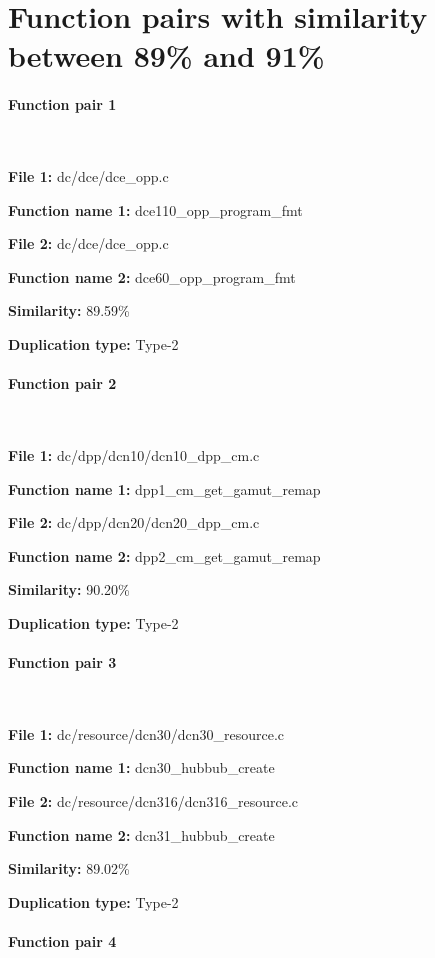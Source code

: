 \section{Function pairs with similarity between 89\% and 91\%}

\paragraph{Function pair 1 }  

\

\textbf{File 1:} dc/dce/dce\_opp.c

\textbf{Function name 1:} dce110\_opp\_program\_fmt

\textbf{File 2:} dc/dce/dce\_opp.c

\textbf{Function name 2:} dce60\_opp\_program\_fmt

\textbf{Similarity:} 89.59\%

\textbf{Duplication type:} Type-2


\paragraph{Function pair 2 }  

\

\textbf{File 1:} dc/dpp/dcn10/dcn10\_dpp\_cm.c

\textbf{Function name 1:} dpp1\_cm\_get\_gamut\_remap

\textbf{File 2:} dc/dpp/dcn20/dcn20\_dpp\_cm.c

\textbf{Function name 2:} dpp2\_cm\_get\_gamut\_remap

\textbf{Similarity:} 90.20\%

\textbf{Duplication type:} Type-2


\paragraph{Function pair 3 }  

\

\textbf{File 1:} dc/resource/dcn30/dcn30\_resource.c

\textbf{Function name 1:} dcn30\_hubbub\_create

\textbf{File 2:} dc/resource/dcn316/dcn316\_resource.c

\textbf{Function name 2:} dcn31\_hubbub\_create

\textbf{Similarity:} 89.02\%

\textbf{Duplication type:} Type-2


\paragraph{Function pair 4 }  

